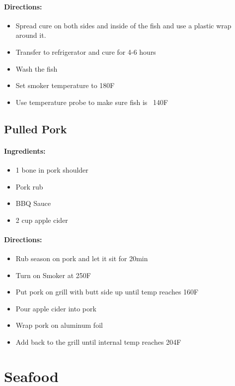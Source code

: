 \documentclass{article}
\begin{document}
\paragraph{Directions:}
\begin{itemize}
    \item Spread cure on both sides and inside of the fish and use a plastic wrap around it.
    \item Transfer to refrigerator and cure for 4-6 hours
    \item Wash the fish
    \item Set smoker temperature to 180F
    \item Use temperature probe to make sure fish is ~140F
\end{itemize}

\subsection{Pulled Pork}

\paragraph{Ingredients:}
\begin{itemize}
    \item 1 bone in pork shoulder
    \item Pork rub
    \item BBQ Sauce
    \item 2 cup apple cider
\end{itemize}

\paragraph{Directions:}
\begin{itemize}
    \item Rub season on pork and let it sit for 20min
    \item Turn on Smoker at 250F
    \item Put pork on grill with butt side up until temp reaches 160F
    \item Pour apple cider into pork
    \item Wrap pork on aluminum foil
    \item Add back to the grill until internal temp reaches 204F
\end{itemize}

\section{Seafood}
\end{document}
